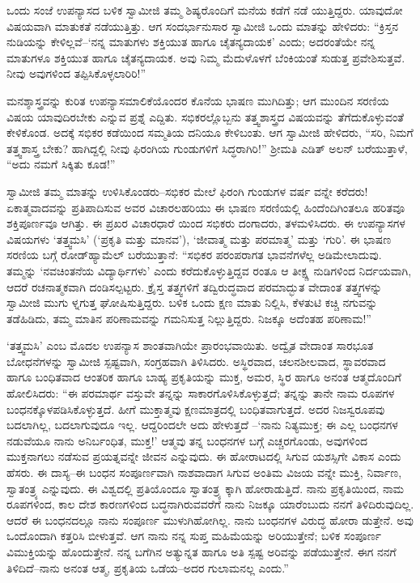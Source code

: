 ಒಂದು ಸಂಜೆ ಉಪನ್ಯಾಸದ ಬಳಿಕ ಸ್ವಾಮೀಜಿ ತಮ್ಮ ಶಿಷ್ಯರೊಂದಿಗೆ ಮನೆಯ ಕಡೆಗೆ ನಡೆ ಯುತ್ತಿದ್ದರು. ಯಾವುದೋ ವಿಷಯವಾಗಿ ಮಾತುಕತೆ ನಡೆಯುತ್ತಿತ್ತು. ಆಗ ಸಂದರ್ಭಾನುಸಾರ ಸ್ವಾಮೀಜಿ ಒಂದು ಮಾತನ್ನು ಹೇಳಿದರು: “ಕ್ರಿಸ್ತನ ನುಡಿಯನ್ನು ಕೇಳಿಲ್ಲವೆ–‘ನನ್ನ ಮಾತುಗಳು ಶಕ್ತಿಯುತ ಹಾಗೂ ಚೈತನ್ಯದಾಯಕ’ ಎಂದು; ಅದರಂತೆಯೇ ನನ್ನ ಮಾತುಗಳೂ ಶಕ್ತಿಯುತ ಹಾಗೂ ಚೈತನ್ಯದಾಯಕ. ಅವು ನಿಮ್ಮ ಮೆದುಳೊಳಗೆ ಬೆಂಕಿಯಂತೆ ಸುಡುತ್ತ ಪ್ರವೇಶಿಸುತ್ತವೆ. ನೀವು ಅವುಗಳಿಂದ ತಪ್ಪಿಸಿಕೊಳ್ಳಲಾರಿರಿ!”

ಮನಶ್ಶಾಸ್ತ್ರವನ್ನು ಕುರಿತ ಉಪನ್ಯಾಸಮಾಲಿಕೆಯೊಂದರ ಕೊನೆಯ ಭಾಷಣ ಮುಗಿದಿತ್ತು; ಆಗ ಮುಂದಿನ ಸರಣಿಯ ವಿಷಯ ಯಾವುದಿರಬೇಕು ಎನ್ನುವ ಪ್ರಶ್ನೆ ಎದ್ದಿತು. ಸಭಿಕರಲ್ಲೊಬ್ಬನು ತತ್ತ್ವಶಾಸ್ತ್ರದ ವಿಷಯವನ್ನು ತೆಗೆದುಕೊಳ್ಳುವಂತೆ ಕೇಳಿಕೊಂಡ. ಅದಕ್ಕೆ ಸಭಿಕರ ಕಡೆಯಿಂದ ಸಮ್ಮತಿಯ ದನಿಯೂ ಕೇಳಿಬಂತು. ಆಗ ಸ್ವಾಮೀಜಿ ಹೇಳಿದರು, “ಸರಿ, ನಿಮಗೆ ತತ್ತ್ವಶಾಸ್ತ್ರ ಬೇಕು? ಹಾಗಿದ್ದಲ್ಲಿ ನೀವು ಫಿರಂಗಿಯ ಗುಂಡುಗಳಿಗೆ ಸಿದ್ಧರಾಗಿರಿ!” ಶ್ರೀಮತಿ ಎಡಿತ್ ಅಲನ್ ಬರೆಯುತ್ತಾಳೆ, “ಅದು ನಮಗೆ ಸಿಕ್ಕಿತು ಕೂಡ!”

ಸ್ವಾಮೀಜಿ ತಮ್ಮ ಮಾತನ್ನು ಉಳಿಸಿಕೊಂಡರು–ಸಭಿಕರ ಮೇಲೆ ಫಿರಂಗಿ ಗುಂಡುಗಳ ವರ್ಷ ವನ್ನೇ ಕರೆದರು! ಏಕಾತ್ಮವಾದವನ್ನು ಪ್ರತಿಪಾದಿಸುವ ಅವರ ವಿಚಾರಲಹರಿಯು ಈ ಭಾಷಣ ಸರಣಿಯಲ್ಲಿ ಹಿಂದೆಂದಿಗಿಂತಲೂ ಹರಿತವೂ ಶಕ್ತಿಪೂರ್ಣವೂ ಆಗಿತ್ತು. ಈ ಪ್ರಖರ ವಿಚಾರಧಾರೆ ಯಿಂದ ಸಭಿಕರು ದಂಗಾದರು, ತಳಮಳಿಸಿದರು. ಈ ಉಪನ್ಯಾಸಗಳ ವಿಷಯಗಳು ‘ತತ್ತ್ವಮಸಿ’ (‘ಪ್ರಕೃತಿ ಮತ್ತು ಮಾನವ’), ‘ಜೀವಾತ್ಮ ಮತ್ತು ಪರಮಾತ್ಮ’ ಮತ್ತು ‘ಗುರಿ’. ಈ ಭಾಷಣ ಸರಣಿಯ ಬಗ್ಗೆ ರೋಡ್​ಹ್ಯಾಮೆಲ್ ಬರೆಯುತ್ತಾನೆ: “ಸಭಿಕರ ಪರಂಪರಾಗತ ಭಾವನೆಗಳೆಲ್ಲ ಅಡಿಮೇಲಾದುವು. ತಮ್ಮನ್ನು ‘ನವಚಿಂತನೆಯ ವಿದ್ಯಾರ್ಥಿಗಳು’ ಎಂದು ಕರೆದುಕೊಳ್ಳುತ್ತಿದ್ದವ ರಂತೂ ಆ ತೀಕ್ಷ್ಣ ನುಡಿಗಳಿಂದ ನಿರ್ದಯವಾಗಿ, ಆದರೆ ರಚನಾತ್ಮಕವಾಗಿ ದಂಡಿಸಲ್ಪಟ್ಟರು. ಕ್ರೈಸ್ತ ತತ್ತ್ವಗಳಿಗೆ ತದ್ವಿರುದ್ಧವಾದ ಪರಮಾದ್ಭುತ ವೇದಾಂತ ತತ್ತ್ವಗಳನ್ನು ಸ್ವಾಮೀಜಿ ಮುಗು ಳ್ನಗುತ್ತ ಘೋಷಿಸುತ್ತಿದ್ದರು. ಬಳಿಕ ಒಂದು ಕ್ಷಣ ಮಾತು ನಿಲ್ಲಿಸಿ, ಕೆಳತುಟಿ ಕಚ್ಚಿ ನಗುವನ್ನು ತಡೆಹಿಡಿದು, ತಮ್ಮ ಮಾತಿನ ಪರಿಣಾಮವನ್ನು ಗಮನಿಸುತ್ತ ನಿಲ್ಲುತ್ತಿದ್ದರು. ನಿಜಕ್ಕೂ ಅದೆಂತಹ ಪರಿಣಾಮ!”

‘ತತ್ತ್ವಮಸಿ’ ಎಂಬ ಮೊದಲ ಉಪನ್ಯಾಸ ಶಾಂತವಾಗಿಯೇ ಪ್ರಾರಂಭವಾಯಿತು. ಅದ್ವೈತ ವೇದಾಂತ ಸಾರಭೂತ ಬೋಧನೆಗಳನ್ನು ಸ್ವಾಮೀಜಿ ಸ್ಪಷ್ಟವಾಗಿ, ಸಂಗ್ರಹವಾಗಿ ತಿಳಿಸಿದರು. ಅಸ್ಥಿರವಾದ, ಚಲನಶೀಲವಾದ, ಸ್ಥಾವರವಾದ ಹಾಗೂ ಬಂಧಿತವಾದ ಆಂತರಿಕ ಹಾಗೂ ಬಾಹ್ಯ ಪ್ರಕೃತಿಯನ್ನು ಮುಕ್ತ, ಅಮರ, ಸ್ಥಿರ ಹಾಗೂ ಅನಂತ ಆತ್ಮದೊಂದಿಗೆ ಹೋಲಿಸಿದರು: “ಈ ಪರಮಾರ್ಥ ವಸ್ತುವೇ ತನ್ನನ್ನು ಸಾಕಾರಗೊಳಿಸಿಕೊಳ್ಳುತ್ತದೆ; ತನ್ನನ್ನು ತಾನೇ ನಾಮ ರೂಪಗಳ ಬಂಧನಕ್ಕೊಳಪಡಿಸಿಕೊಳ್ಳುತ್ತದೆ. ಹೀಗೆ ಮುಕ್ತಾತ್ಮವು ಕ್ಷಣಮಾತ್ರದಲ್ಲಿ ಬಂಧಿತವಾಗುತ್ತದೆ. ಅದರ ನಿಜಸ್ವರೂಪವು ಬದಲಾಗಿಲ್ಲ, ಬದಲಾಗುವುದೂ ಇಲ್ಲ. ಆದ್ದರಿಂದಲೇ ಅದು ಹೇಳುತ್ತದೆ –‘ನಾನು ನಿತ್ಯಮುಕ್ತ; ಈ ಎಲ್ಲ ಬಂಧನಗಳ ನಡುವೆಯೂ ನಾನು ಅನಿರ್ಬಂಧಿತ, ಮುಕ್ತ!’ ಆತ್ಮವು ತನ್ನ ಬಂಧನಗಳ ಬಗ್ಗೆ ಎಚ್ಚರಗೊಂಡು, ಅವುಗಳಿಂದ ಮುಕ್ತನಾಗಲು ನಡೆಸುವ ಪ್ರಯತ್ನವನ್ನೇ ಜೀವನ ಎನ್ನುವುದು. ಈ ಹೋರಾಟದಲ್ಲಿ ಸಿಗುವ ಯಶಸ್ಸಿಗೇ ವಿಕಾಸ ಎಂದು ಹೆಸರು. ಈ ದಾಸ್ಯ–ಈ ಬಂಧನ ಸಂಪೂರ್ಣವಾಗಿ ನಾಶವಾದಾಗ ಸಿಗುವ ಅಂತಿಮ ವಿಜಯ ವನ್ನೇ ಮುಕ್ತಿ, ನಿರ್ವಾಣ, ಸ್ವಾತಂತ್ರ್ಯ ಎನ್ನುವುದು. ಈ ವಿಶ್ವದಲ್ಲಿ ಪ್ರತಿಯೊಂದೂ ಸ್ವಾತಂತ್ರ್ಯ ಕ್ಕಾಗಿ ಹೋರಾಡುತ್ತಿದೆ. ನಾನು ಪ್ರಕೃತಿಯಿಂದ, ನಾಮ ರೂಪಗಳಿಂದ, ಕಾಲ ದೇಶ ಕಾರಣಗಳಿಂದ ಬದ್ಧನಾಗಿರುವವರೆಗೆ ನಾನು ನಿಜಕ್ಕೂ ಯಾರೆಂಬುದು ನನಗೆ ತಿಳಿದಿರುವುದಿಲ್ಲ. ಆದರೆ ಈ ಬಂಧನದಲ್ಲೂ ನಾನು ಸಂಪೂರ್ಣ ಮುಳುಗಿಹೋಗಿಲ್ಲ. ನಾನು ಬಂಧನಗಳ ವಿರುದ್ಧ ಹೋರಾ ಡುತ್ತೇನೆ. ಅವು ಒಂದೊಂದಾಗಿ ಕತ್ತರಿಸಿ ಬೀಳುತ್ತವೆ. ಆಗ ನಾನು ನನ್ನ ಸುಪ್ತ ಮಹಿಮೆಯನ್ನು ಅರಿಯುತ್ತೇನೆ; ಬಳಿಕ ಸಂಪೂರ್ಣ ವಿಮುಕ್ತಿಯನ್ನು ಹೊಂದುತ್ತೇನೆ. ನನ್ನ ಬಗೆಗಿನ ಅತ್ಯುನ್ನತ ಹಾಗೂ ಅತಿ ಸ್ಪಷ್ಟ ಅರಿವನ್ನು ಪಡೆಯುತ್ತೇನೆ. ಈಗ ನನಗೆ ತಿಳಿದಿದೆ–ನಾನು ಅನಂತ ಆತ್ಮ, ಪ್ರಕೃತಿಯ ಒಡೆಯ–ಅದರ ಗುಲಾಮನಲ್ಲ ಎಂದು.”

